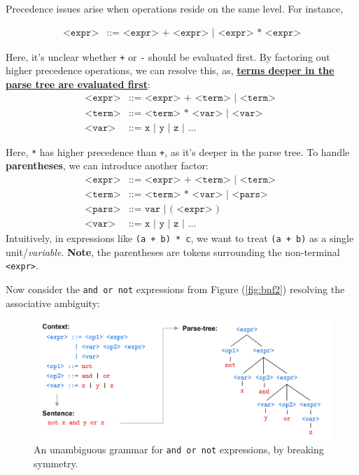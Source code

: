 \begin{theo}

    Precedence issues arise when operations reside on the same level. For instance,
        
    \vspace{-1em}
        \begin{align*}
            \texttt{<expr>} &\texttt{::= <expr> + <expr> | <expr> * <expr>}
        \end{align*}

    \noindent
    Here, it's unclear whether \texttt{+} or \texttt{-} should be evaluated first. By factoring out higher precedence operations, we can resolve this, 
    as, \underline{\textbf{terms deeper in the parse tree are evaluated first}}:
    \begin{align*}
        \texttt{<expr>} &\texttt{::= <expr> + <term> | <term> }\\
        \texttt{<term>} &\texttt{::= <term> * <var> | <var>}\\
        \texttt{<var>} &\texttt{::= x | y | z | ...}
    \end{align*}

    \vspace{-1em}
    \noindent
    Here, \texttt{*} has higher precedence than \texttt{+}, as it's deeper in the parse tree. To handle 
    \textbf{parentheses}, we can introduce another factor:
    \begin{align*}
        \texttt{<expr>} &\texttt{::= <expr> + <term> | <term> }\\
        \texttt{<term>} &\texttt{::= <term> * <var> | <pars>}\\
        \texttt{<pars>} &\texttt{::= var | ( <expr> )}\\
        \texttt{<var>} &\texttt{::= x | y | z | ...}
    \end{align*}
    \noindent
    Intuitively, in expressions like \texttt{(a + b) * c}, we want to treat \texttt{(a + b)} as a single unit/\textit{variable}. \textbf{Note},
    the parentheses are tokens surrounding the non-terminal \texttt{<expr>}.
\end{theo}

\newpage 

\noindent
Now consider the \texttt{and or not} expressions from Figure (\ref{fig:bnf2}) resolving the associative ambiguity:

\begin{figure}[h]
    \centering
    \includegraphics[width=1\textwidth]{Sections/Formal/amb5.png}
    \caption{An unambiguous grammar for \texttt{and or not} expressions, by breaking symmetry.}
    \label{fig:amb5}
\end{figure}

